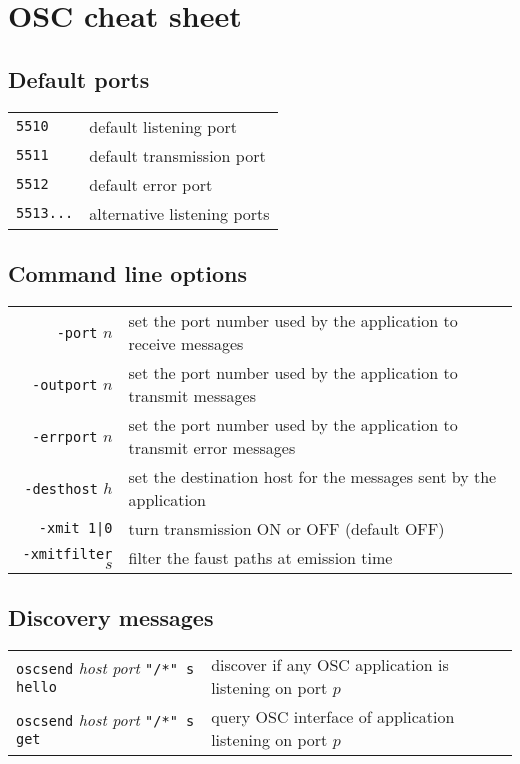 \section{OSC cheat sheet}

\subsection*{Default ports}

\begin{tabular}{ll}
\lstinline'5510' & default listening port\\
\lstinline'5511' & default transmission port\\
\lstinline'5512' & default error port\\
\lstinline'5513...' & alternative listening ports
\end{tabular}

\subsection*{Command line options}

\begin{tabular}{rl}
\lstinline'-port' $n$ & set the port number used by the application to receive messages\\
\lstinline'-outport' $n$ & set the port number used by the application to transmit messages\\
\lstinline'-errport' $n$ & set the port number used by the application to transmit error messages\\
\lstinline'-desthost' $h$ & set the destination host for the messages sent by the application\\
\lstinline'-xmit 1|0' & turn transmission ON or OFF (default OFF) \\
\lstinline'-xmitfilter' $s$ & filter the faust paths at emission time
\end{tabular}

\subsection*{Discovery messages}

\begin{tabular}{ll}
\lstinline'oscsend' \emph{host} \emph{port} \lstinline'"/*" s hello' & discover if any OSC application is listening on port $p$ \\
\lstinline'oscsend' \emph{host} \emph{port} \lstinline'"/*" s get' & query OSC interface of application listening on port $p$
\end{tabular}

